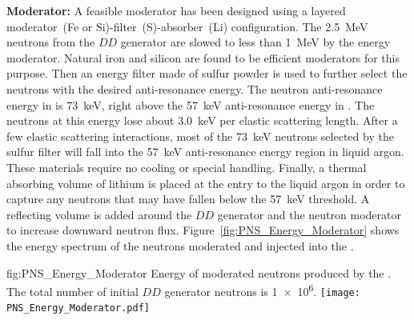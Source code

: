 {\bf Moderator:}  A feasible moderator has been designed using a layered moderator~(Fe or Si)-filter~(S)-absorber~(Li) %
configuration. The \SI{2.5}{\MeV} neutrons from the $DD$ generator are slowed to less than \SI{1}{\MeV} by the energy moderator. Natural iron and silicon are found to be efficient moderators for this purpose. Then an energy filter made of sulfur powder is used to further select the neutrons with the desired anti-resonance energy.
The neutron anti-resonance energy in  is \SI{73}{\keV}, right above the \SI{57}{\keV} anti-resonance energy in . The neutrons at this energy lose about \SI{3.0}{\keV} per elastic scattering length. After a few elastic scattering interactions, most of the \SI{73}{\keV} neutrons selected by the sulfur filter will fall into the \SI{57}{\keV} anti-resonance energy region in liquid argon. These materials require no cooling or special handling. Finally, a thermal absorbing volume of lithium is placed at the entry to the liquid argon in order to capture any neutrons that may have fallen below the \SI{57}{\keV} threshold. A reflecting volume is added around the $DD$ generator and the neutron moderator to increase downward neutron flux. Figure~\ref{fig:PNS_Energy_Moderator} shows the energy spectrum of the neutrons moderated and injected into the .

\begin{dunefigure}{fig:PNS_Energy_Moderator}
{Energy of moderated neutrons produced by the . %
The total number of initial $DD$ generator neutrons is \num{1e6}.}
\texttt{[image: PNS\_Energy\_Moderator.pdf]}
\end{dunefigure}

